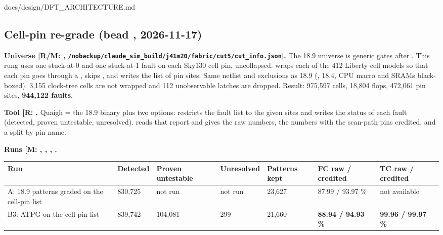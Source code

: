 \begin{relocated}{docs/design/DFT_ARCHITECTURE.md}
\subsection{Cell-pin re-grade (bead ,
2026-11-17)}\label{tm:ch:dft-architecture:1810-cell-pin-re-grade}

\textbf{Universe {[}R/M: ,
\texttt{/\allowbreak{}nobackup/\allowbreak{}claude\_\allowbreak{}sim\_\allowbreak{}build/\allowbreak{}j41m20/\allowbreak{}fabric/\allowbreak{}cut5/\allowbreak{}cut\_\allowbreak{}info.\allowbreak{}json}{]}.}
The 18.9 universe is generic gates after . This rung uses
one stuck-at-0 and one stuck-at-1 fault on each Sky130 cell pin,
uncollapsed.  wraps each of the 412 Liberty
cell models so that each pin goes through a , skips
, and writes the list of pin sites. Same netlist and
exclusions as 18.9 (, 18.4, CPU macro and
SRAMs black-boxed). 3,155 clock-tree cells are not wrapped and 112
unobservable latches are dropped. Result: 975,597 cells, 18,804 flops,
472,061 pin sites, \textbf{944,122 faults}.

\textbf{Tool {[}R:
\code{tools/dft/atpg/quaigh/0002-fault-sites.patch}{]}.} Quaigh
 = the 18.9 binary plus two options:
 restricts the fault list to the given sites and
 writes the status of each fault (detected, proven
untestable, unresolved).  reads
that report and gives the raw numbers, the numbers with the scan-path
pins credited, and a split by pin name.

\textbf{Runs {[}M: ,
, , \code{run.log}{]}.}

{\small
\begin{longtable}{@{}p{30mm}p{18mm}p{18mm}p{18mm}p{14mm}p{16mm}p{16mm}@{}}
\toprule
Run & Detected & Proven untestable & Unresolved & Patterns kept & FC raw / credited & TC raw / credited \\
\midrule
\endhead
\bottomrule
\endlastfoot
A: 18.9 patterns graded on the cell-pin list & 830,725 & not run & not run & 23,627 & 87.99 / 93.97 \% & not available \\
B3: ATPG on the cell-pin list & 839,742 & 104,081 & 299 & 21,660 & \textbf{88.94 / 94.93 \%} & \textbf{99.96 / 99.97 \%} \\
\end{longtable}
}


\end{relocated}
